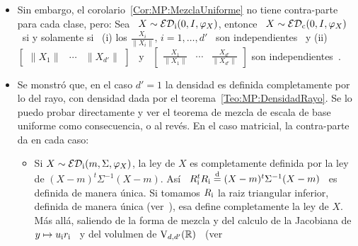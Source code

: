 \begin{itemize}
\begin{itemize}
{      independiente  de   $\Lambda_\simed  \ge  0$   matriz  aleatoria  diagonal
      positiva.}
    Pasando, aparece que $\Lambda_\simed  = \Diag(\lambda\left( X \right))$, \ie
    de diagonal el vector de las autovalores de $X$.
  \end{itemize}
  En  los cuatro  primeros  casos, para  $d'  = 1$,  se  recupera obviamente  el
  teorema~~\ref{Teo:MP:MezclaUniforme}.
%
\item   Sin   embargo,   el   corolario~\ref{Cor:MP:MezclaUniforme}   no   tiene
  contra-parte para  cada clase, pero:  Sea \ $X  \sim \mathcal{ED}_{\mathrm{i}}(0,I,\varphi_X)$,
  entonce  \ $X\sim  \mathcal{ED}_{\mathrm{c}}(0,I,\varphi_X)$  \ si  y  solamente si  \ (i)  los
  $\frac{X_i}{\| X_i \|}, \, i = 1, \ldots , d'$ \ son independientes \ y (ii) \
  $\begin{bmatrix}  \| X_1  \| &  \cdots &  \| X_{d'}  \| \end{bmatrix}$  \  y \
  $\begin{bmatrix}  \frac{X_1}{\| X_1  \|}  & \cdots  & \frac{X_{d'}}{\|  X_{d'}
      \|} \end{bmatrix}$ son independientes~\cite[Lema~6]{FanChe84}.
%
\item  Se  monstr\'o  que,  en  el  caso  $d'  =  1$  la  densidad  es  definida
  completamente    por   lo    del   rayo,    con   densidad    dada    por   el
  teorema~\ref{Teo:MP:DensidadRayo}. Se  lo puedo  probar directamente y  ver el
  teorema de mezcla de escala de  base uniforme como consecuencia, o al rev\'es.
  En el caso matricial, la contra-parte da en cada caso:
  \begin{itemize}
  \item Si $X \sim \mathcal{ED}_{\mathrm{i}}(m,\Sigma,\varphi_X)$, la ley de $X$ es completamente
    definida por la ley de $(X-m)^t \Sigma^{-1} (X-m)$. As\'i \ $R_{\mathrm{i}}^t R_{\mathrm{i}}
    \stackrel{\mathrm{d}}{=}  (X-m)^t \Sigma^{-1}  (X-m)$ \  es  definida de  manera \'unica.   Si
    tomamos  $R_{\mathrm{i}}$ la raiz  triangular inferior,  definida de  manera \'unica
    (ver~\cite{HorJoh13, Bha97}), esa define  completamente la ley de $X$. M\'as
    all\'a, saliendo de la  forma de mezcla y del calculo de  la Jacobiana de $y
    \mapsto   u_{\mathrm{i}}  r_{\mathrm{i}}$~\cite[Teo.~2.1.13]{Mui82}   y   del  volulmen   de
    $\mathrm{V}_{d,d'}(\mathbb{R})$~\cite[Teo.~2.1.15]{Mui82}                           (ver

\end{itemize}
\end{itemize}
